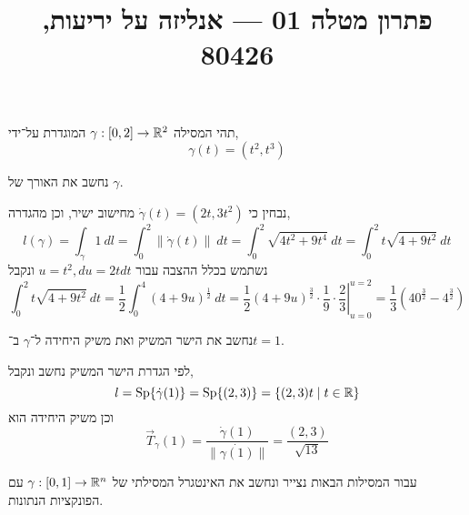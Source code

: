 
\title{פתרון מטלה 01 --- אנליזה על יריעות, 80426}
\usepackage{pgfplots}
\pgfplotsset{compat=1.18}


\maketitle
\maketitleprint{}

\question{}
תהי המסילה $\gamma : [0, 2] \to \mathbb{R}^2$ המוגדרת על־ידי,
\[
	\gamma(t) = (t^2, t^3)
\]

\subquestion{}
נחשב את האורך של $\gamma$.
\begin{solution}
	נבחין כי $\dot{\gamma}(t) = (2t, 3t^2)$ מחישוב ישיר, וכן מהגדרה,
	\[
		l(\gamma)
		= \int_\gamma 1\ dl
		= \int_0^2 \lVert \dot{\gamma}(t) \rVert\ dt
		= \int_0^2 \sqrt{4t^2 + 9t^4}\ dt
		= \int_0^2 t \sqrt{4 + 9t^2}\ dt
	\]
	נשתמש בכלל ההצבה עבור $u = t^2, du = 2t dt$ ונקבל
	\[
		\int_0^2 t \sqrt{4 + 9t^2}\ dt
		= \frac{1}{2} \int_0^4 {(4 + 9u)}^\frac{1}{2}\ dt
		= \left. \frac{1}{2} {(4 + 9u)}^\frac{3}{2} \cdot \frac{1}{9} \cdot \frac{2}{3} \right\rvert_{u = 0}^{u = 2}
		= \frac{1}{3} ({40}^\frac{3}{2} - 4^\frac{3}{2})
	\]
\end{solution}

\subquestion{}
נחשב את הישר המשיק ואת משיק היחידה ל־$\gamma$ ב־$t = 1$.
\begin{solution}
	לפי הגדרת הישר המשיק נחשב ונקבל,
	\[
		l
		= \operatorname{Sp}\{ \dot{\gamma}(1) \}
		= \operatorname{Sp}\{ (2, 3) \}
		= \{ (2, 3)t \mid t \in \mathbb{R} \}
	\]
	וכן משיק היחידה הוא
	\[
		\vec{T}_\gamma(1)
		= \frac{\dot{\gamma}(1)}{\lVert \dot{\gamma(1)} \rVert}
		= \frac{(2, 3)}{\sqrt{13}}
	\]
\end{solution}

\question{}
עבור המסילות הבאות נצייר ונחשב את האינטגרל המסילתי של $\gamma : [0, 1] \to \mathbb{R}^n$ עם הפונקציות הנתונות.

